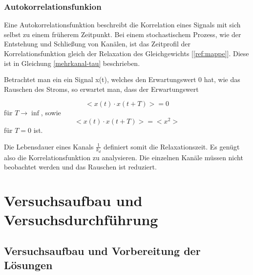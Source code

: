 \documentclass[a4paper,ngerman]{scrartcl}
\begin{document}
\subsubsection{Autokorrelationsfunkion}

Eine Autokorrelationsfunktion beschreibt die Korrelation eines Signals mit sich selbst zu einem früherem Zeitpunkt. 
Bei einem stochastischem Prozess, wie der Entstehung und Schließung von Kanälen, ist das Zeitprofil der Korrelationsfunktion gleich der Relaxation des Gleichgewichts [\ref{ref:mappe}]. Diese ist in Gleichung \ref{mehrkanal-tau} beschrieben.

Betrachtet man ein ein Signal x(t), welches den Erwartungswert 0 hat, wie das Rauschen des Stroms, so erwartet man, dass der Erwartungswert 

\begin{equation}
<x(t) \cdot x(t+T)> = 0
\end{equation}
für $T \rightarrow \inf $, sowie
\begin{equation}
<x(t) \cdot x(t+T)> = <x^2>
\end{equation}
für $T=0$ ist. 

Die Lebensdauer eines Kanals $\frac{1}{k_d}$ definiert somit die Relaxationszeit.  Es genügt also die Korrelationsfunktion zu analysieren. Die einzelnen Kanäle müssen nicht beobachtet werden und das Rauschen ist reduziert.



\clearpage
\section{Versuchsaufbau und Versuchsdurchführung}



\subsection{Versuchsaufbau und Vorbereitung der Lösungen}
\label{sec:bilayer-vorbereitung}
\end{document}
